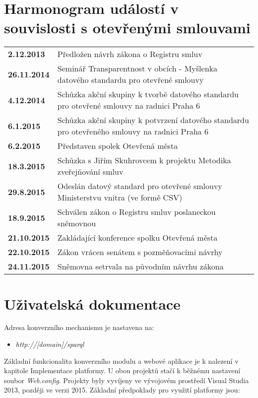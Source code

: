 
\section*{Harmonogram událostí v souvislosti s otevřenými smlouvami}

\begin{table}[h]
\begin{tabular}{lp{120mm}}
\textbf{2.12.2013} & Předložen návrh zákona o Registru smluv \\
\textbf{26.11.2014} & Seminář Transparentnost v obcích - Myšlenka datového standardu pro otevřené smlouvy \\
\textbf{4.12.2014} & Schůzka akční skupiny k tvorbě datového standardu pro otevřené smlouvy na radnici Praha 6 \\
\textbf{6.1.2015} & Schůzka akční skupiny k potvrzení datového standardu pro otevřeného smlouvy na radnici Praha 6 \\
\textbf{6.2.2015} & Představen spolek Otevřená města \\
\textbf{18.3.2015} & Schůzka s Jiřím Skuhrovcem k projektu Metodika zveřejňování smluv \\
\textbf{29.8.2015} & Odeslán datový standard pro otevřené smlouvy Ministerstvu vnitra (ve formě CSV) \\
\textbf{18.9.2015} & Schválen zákon o Registru smluv poslaneckou sněmovnou  \\
\textbf{21.10.2015} & Zakládající konference spolku Otevřená města  \\
\textbf{22.10.2015} & Zákon vrácen senátem s pozměňovacími návrhy  \\
\textbf{24.11.2015} & Sněmovna setrvala na původním návrhu zákona \\
\end{tabular}
\end{table}


\section*{Uživatelská dokumentace}

Adresa konverzního mechanismu je nastavena na:
\begin{itemize}
	\item \textit{http://[domain]/sparql}
\end{itemize}
Základní funkcionalita konverzního modulu a webové aplikace je k nalezení v kapitole Implementace platformy. U obou projektů stačí k běžnému nastavení soubor \textit{Web.config}. Projekty byly vyvíjeny ve vývojovém prostředí Visual Studia 2013, později ve verzi 2015. Základní předpoklady pro využití platformy jsou:


